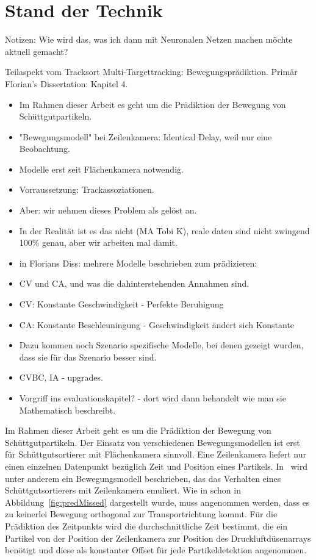 \section{Stand der Technik}
\label{cap:relWork}

Notizen:
\color{blue}
Wie wird das, was ich dann mit Neuronalen Netzen machen möchte aktuell gemacht?


Teilaspekt vom Tracksort Multi-Targettracking: Bewegungsprädiktion.
Primär Florian's Dissertation: Kapitel 4.


\begin{itemize}
    \item Im Rahmen dieser Arbeit es geht um die Prädiktion der Bewegung von Schüttgutpartikeln.
    \item "Bewegungsmodell" bei Zeilenkamera: Identical Delay, weil nur eine Beobachtung.
    \item Modelle erst seit Flächenkamera notwendig.
    \item Vorraussetzung: Trackassoziationen.
    \item Aber: wir nehmen dieses Problem als gelöst an.
    \item In der Realität ist es das nicht (MA Tobi K), reale daten sind nicht zwingend 100\% genau, aber wir arbeiten mal damit.
    \item in Florians Diss: mehrere Modelle beschrieben zum prädizieren:
    \item CV und CA, und was die dahinterstehenden Annahmen sind.
    \item CV: Konstante Geschwindigkeit - Perfekte Beruhigung
    \item CA: Konstante Beschleuningung - Geschwindigkeit ändert sich Konstante
    \item Dazu kommen noch Szenario spezifische Modelle, bei denen gezeigt wurden, dass sie für das Szenario besser sind.
    \item CVBC, IA - upgrades.
    \item Vorgriff ins evaluationskapitel? - dort wird dann behandelt wie man sie Mathematisch beschreibt. 
\end{itemize}

\color{black}


Im Rahmen dieser Arbeit geht es um die Prädiktion der Bewegung von Schüttgutpartikeln.
Der Einsatz von verschiedenen Bewegungsmodellen ist erst für Schüttgutsortierer mit Flächenkamera sinnvoll.
Eine Zeilenkamera liefert nur einen einzelnen Datenpunkt bezüglich Zeit und Position eines Partikels.
In~\cite{Pfaff2018} wird unter anderem ein Bewegungsmodell beschrieben, das das Verhalten eines Schüttgutsortierers mit Zeilenkamera emuliert.
Wie in schon in Abbildung~\ref{fig:predMissed} dargestellt wurde, muss angenommen werden, dass es zu keinerlei Bewegung orthogonal zur Transportrichtung kommt.
Für die Prädiktion des Zeitpunkts wird die durchschnittliche Zeit bestimmt, die ein Partikel von der Position der Zeilenkamera zur Position des Druckluftdüsenarrays benötigt 
und diese als konstanter Offset für jede Partikeldetektion angenommen.

